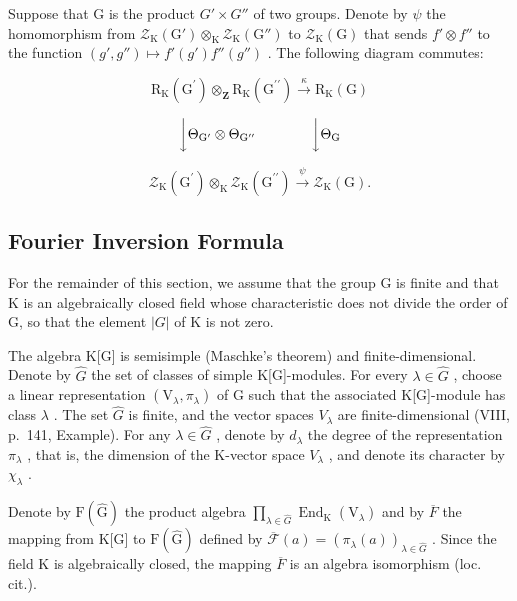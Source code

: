 Suppose that G is the product \(G' \times G''\) of two groups. Denote by \(\psi\) the homomorphism from \(\mathcal{Z}_{\mathrm{K}}(\mathrm{G}') \otimes_{\mathrm{K}} \mathcal{Z}_{\mathrm{K}}(\mathrm{G}'' )\) to \(\mathcal{Z}_{\mathrm{K}}(\mathrm{G})\) that sends \(f' \otimes f''\) to the function \((g', g'') \mapsto f'(g')f''(g'')\) . The following diagram commutes:

\[
\mathrm{R} _ {\mathrm{K}} (\mathrm{G} ^ {\prime}) \otimes_ {\mathbf {Z}} \mathrm{R} _ {\mathrm{K}} (\mathrm{G} ^ {\prime \prime}) \xrightarrow {\kappa} \mathrm{R} _ {\mathrm{K}} (\mathrm{G})
\]

\[
\bigg \downarrow \Theta_ {\mathrm{G} ^ {\prime}} \otimes \Theta_ {\mathrm{G} ^ {\prime \prime}} \qquad \qquad \bigg \downarrow \Theta_ {\mathrm{G}}
\]

\[
\mathcal {Z} _ {\mathrm{K}} (\mathrm{G} ^ {\prime}) \otimes_ {\mathrm{K}} \mathcal {Z} _ {\mathrm{K}} (\mathrm{G} ^ {\prime \prime}) \xrightarrow {\psi} \mathcal {Z} _ {\mathrm{K}} (\mathrm{G}).
\]

\subsection{Fourier Inversion Formula}

For the remainder of this section, we assume that the group G is finite and that K is an algebraically closed field whose characteristic does not divide the order of G, so that the element \(|G|\) of K is not zero.

The algebra K{[}G{]} is semisimple (Maschke's theorem) and finite-dimensional. Denote by \(\widehat{G}\) the set of classes of simple K{[}G{]}-modules. For every \(\lambda\in\widehat{G}\) , choose a linear representation \((\mathrm{V}_{\lambda},\pi_{\lambda})\) of G such that the associated K{[}G{]}-module has class \(\lambda\) . The set \(\widehat{G}\) is finite, and the vector spaces \(V_{\lambda}\) are finite-dimensional (VIII, p.~141, Example). For any \(\lambda\in\widehat{G}\) , denote by \(d_{\lambda}\) the degree of the representation \(\pi_{\lambda}\) , that is, the dimension of the K-vector space \(V_{\lambda}\) , and denote its character by \(\chi_{\lambda}\) .

Denote by \(\mathrm{F}(\widehat{\mathrm{G}})\) the product algebra \(\prod_{\lambda\in\widehat{G}}\operatorname{End}_{\mathrm{K}}(\mathrm{V}_{\lambda})\) and by \(\overline{F}\) the mapping from K{[}G{]} to \(\mathrm{F}(\widehat{\mathrm{G}})\) defined by \(\overline{\mathcal{F}}(a)=(\pi_{\lambda}(a))_{\lambda\in\widehat{G}}\) . Since the field K is algebraically closed, the mapping \(\overline{F}\) is an algebra isomorphism (loc. cit.).

